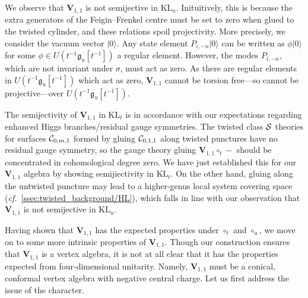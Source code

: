 \documentclass[a4paper]{article}
\def\IV{\mathbb{V}}
\def\CC{{\cal C}}
\def\SS{{\cal S}}
\newcommand{\ket}[1]{|{#1}\rangle}
\def\gf{\mathfrak{g}}
\def \zf{\mathfrak{z}}
\def \cf{{\it cf.}}
\def \KL{\mathrm{KL}}
\def\V{\mathbf{V}}
\begin{document}
We observe that $\V_{1,1}$ is not semijective in $\KL_u$. Inituitively, this is because the extra generators of the Feigin--Frenkel centre must be set to zero when glued to the twisted cylinder, and these relations spoil projectivity. More precisely, we consider the %
vacuum vector $\ket{0}$. Any state element $P_{i,-n}\ket{0}$ can be written as $\phi\ket{0}$ for some $\phi\in U(t^{-1}\gf_u[t^{-1}])$ a regular element. However, the modes $P_{i,-n}$, which are not invariant under $\sigma$, must act as zero.%
As there are regular elements in $U(t^{-1}\gf_u[t^{-1}])$ which act as zero, %
$\V_{1,1}$ cannot be torsion free---so cannot be projective---over $U(t^{-1}\gf_u[t^{-1}])$.

The semijectivity of $\V_{1,1}$ in $\KL_t$ is in accordance with our expectations regarding enhanced Higgs branches/residual gauge symmetries. The twisted class $\SS$ theories for surfaces $\CC_{0,m,1}$ formed by gluing $\CC_{0,1,1}$ along twisted punctures have no residual gauge symmetry, so the gauge theory gluing $\V_{1,1}\circ_t-$ should be concentrated in cohomological degree zero. We have just established this for our $\V_{1,1}$ algebra by showing semijiectivity in $\KL_t$. On the other hand, gluing along the untwisted puncture may lead to a higher-genus local system covering space (\cf\ \ref{ssec:twisted_background/HL}), which falls in line with our observation that $\V_{1,1}$ is not semijective in $\KL_u$.

Having shown that $\V_{1,1}$ has the expected properties under $\circ_t$ and $\circ_u$, we move on to some more intrinsic properties of $\V_{1,1}$. Though our construction ensures that $\V_{1,1}$ is a vertex algebra, it is not at all clear that it has the properties expected from four-dimensional unitarity. Namely, $\V_{1,1}$ must be a conical, conformal vertex algebra with negative central charge. Let us first address the issue of the character.
\end{document}
